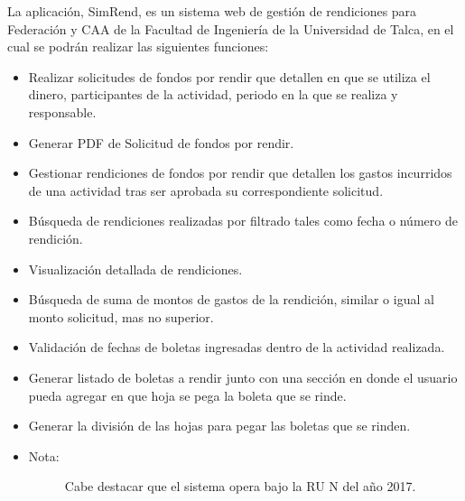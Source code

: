 La aplicación, SimRend, es un sistema web de gestión de rendiciones para Federación y CAA de la Facultad de Ingeniería de la Universidad de Talca, en el cual se podrán realizar las siguientes funciones:

\begin{itemize}
    \item Realizar solicitudes de fondos por rendir que detallen en que se utiliza el dinero, participantes de la actividad, periodo en la que se realiza y responsable.
    
    \item Generar PDF de Solicitud de fondos por rendir.

    \item Gestionar rendiciones de fondos por rendir que detallen los gastos incurridos de una actividad tras ser aprobada su correspondiente solicitud.
    
    \item Búsqueda de rendiciones realizadas por filtrado tales como fecha o número de rendición.
    
    \item Visualización detallada de rendiciones.
    
    \item Búsqueda de suma de montos de gastos de la rendición, similar o igual al monto solicitud, mas no superior.
    
    \item Validación de fechas de boletas ingresadas dentro de la actividad realizada.
    
    \item Generar listado de boletas a rendir junto con una sección en donde el usuario pueda agregar en que hoja se pega la boleta que se rinde.
    
    \item Generar la división de las hojas para pegar las boletas que se rinden.
\end{itemize}

\begin{itemize}
    \item   \begin{description}
                \item[Nota:] Cabe destacar que el sistema opera bajo la RU N del año 2017.
            \end{description}
\end{itemize}
